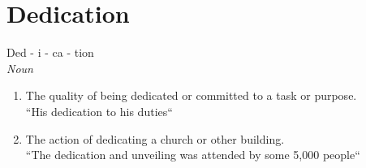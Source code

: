 \chapter{Dedication}

Ded - i - ca - tion \\

\emph{Noun}
\begin{enumerate}
\item The quality of being dedicated or committed to a task or purpose. \\ ``His dedication to his duties``
\item The action of dedicating a church or other building. \\
``The dedication and unveiling was attended by some 5,000 people``
\end{enumerate}
